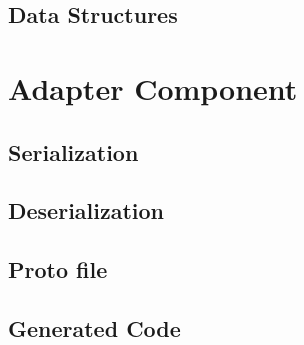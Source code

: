 \subsection{Data Structures}



\section{Adapter Component}
\subsection{Serialization}

\subsection{Deserialization}

\subsection{Proto file}



\subsection{Generated Code}


